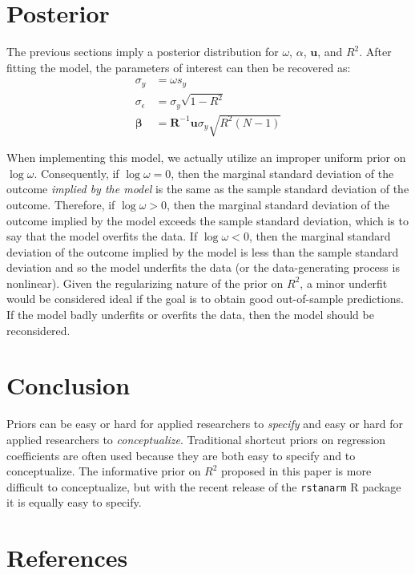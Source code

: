 \documentclass[11pt]{article}
\begin{document}
\section{Posterior}

The previous sections imply a posterior distribution for $\omega$, $\alpha$,
$\mathbf{u}$, and $R^2$. After fitting the model, the parameters of interest can
then be recovered as:
%
\begin{align*}
\sigma_y
  &= \omega s_y \\
\sigma_{\epsilon}
  &= \sigma_y \sqrt{1 - R^2} \\
\boldsymbol{\beta}
  &= \mathbf{R}^{-1} \mathbf{u} \sigma_y \sqrt{R^2 \left(N-1\right)}
\end{align*}

When implementing this model, we actually utilize an improper uniform prior on
$\log \omega$. Consequently, if $\log \omega = 0$, then the marginal standard
deviation of the outcome \emph{implied by the model} is the same as the sample
standard deviation of the outcome. Therefore, if $\log \omega > 0$, then the
marginal standard deviation of the outcome implied by the model exceeds the
sample standard deviation, which is to say that the model overfits the data. If
$\log \omega < 0$, then the marginal standard deviation of the outcome implied
by the model is less than the sample standard deviation and so the model
underfits the data (or the data-generating process is nonlinear). Given the
regularizing nature of the prior on $R^2$, a minor underfit would be considered
ideal if the goal is to obtain good out-of-sample predictions. If the model
badly underfits or overfits the data, then the model should be reconsidered.



\section{Conclusion}

Priors can be easy or hard for applied researchers to \emph{specify} and easy or
hard for applied researchers to \emph{conceptualize}. Traditional shortcut
priors on regression coefficients are often used because they are both easy to
specify and to conceptualize. The informative prior on $R^2$ proposed in this
paper is more difficult to conceptualize, but with the recent release of the
{\tt rstanarm} R package it is equally easy to specify.


\section*{References}
\end{document}
